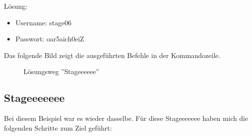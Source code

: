 \documentclass[12pt, a4paper, titlepage, oneside]{scrartcl}
\begin{document}
	Lösung:
	\begin{itemize}
		\item Username: stage06

		\item Passwort: oar5aich0eiZ
	\end{itemize}

	Das folgende Bild zeigt die ausgeführten Befehle in der Kommandozeile.

	\begin{figure}[h!]
		\centering
		\caption{Lösungsweg ''Stageeeeee''}
		\label{fig:stageeeeee_solution}
	\end{figure}

	\newpage

	\subsection{Stageeeeeee}
	Bei diesem Beispiel war es wieder dasselbe. Für diese Stageeeeeee haben mich
	die folgenden Schritte zum Ziel geführt:
\end{document}
